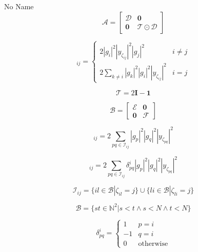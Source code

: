 \documentclass[a4paper,10pt]{article}
\begin{document}
\begin{section}{No Name}
\begin{equation}
\boldsymbol{\mathcal{A}} =
\begin{bmatrix}
\boldsymbol{\mathcal{D}} & \boldsymbol{0}\\
\boldsymbol{0} & \boldsymbol{\mathcal{T}}\odot\boldsymbol{\mathcal{D}}
\end{bmatrix}
\end{equation}

\begin{equation}
[\boldsymbol{\mathcal{D}}]_{ij} = 
\begin{cases}
2|g_i|^2|y_{\zeta_{ij}}|^2|g_j|^2 & i\neq j\\
2\sum_{k \neq i} |g_k|^2|g_i|^2|y_{\zeta_{ij}}|^2 & i = j
\end{cases}
\end{equation}

\begin{equation}
\boldsymbol{\mathcal{T}} = 2\boldsymbol{I}-\boldsymbol{1}
\end{equation}

\begin{equation}
\boldsymbol{\mathcal{B}} =
\begin{bmatrix}
\boldsymbol{\mathcal{E}} & \boldsymbol{0}\\
\boldsymbol{0} & \boldsymbol{\mathcal{F}}
\end{bmatrix}
\end{equation}

\begin{equation}
[\boldsymbol{\mathcal{E}}]_{ij} = 2\sum_{pq\in\mathcal{I}_{ij}} |g_p|^2|g_q|^2|y_{\zeta_{pq}}|^2
\end{equation}

\begin{equation}
[\boldsymbol{\mathcal{F}}]_{ij} = 2\sum_{pq\in\mathcal{I}_{ij}} \delta_{pq}^i |g_p|^2|g_q|^2|y_{\zeta_{pq}}|^2
\end{equation}

\begin{equation}
\mathcal{I}_{ij} = \{il\in\mathcal{B}|\zeta_{il}=j\}\cup\{li\in\mathcal{B}|\zeta_{li}=j\} 
\end{equation}

\begin{equation}
\mathcal{B} = \{st\in\mathbb{N}^2|s<t \wedge s<N \wedge t<N\}
\end{equation}

\begin{equation}
\delta_{pq}^i = 
\begin{cases}
1 & p = i\\
-1 & q = i\\
0 & \textrm{otherwise}
\end{cases}
\end{equation}


\end{section}
\end{document}
